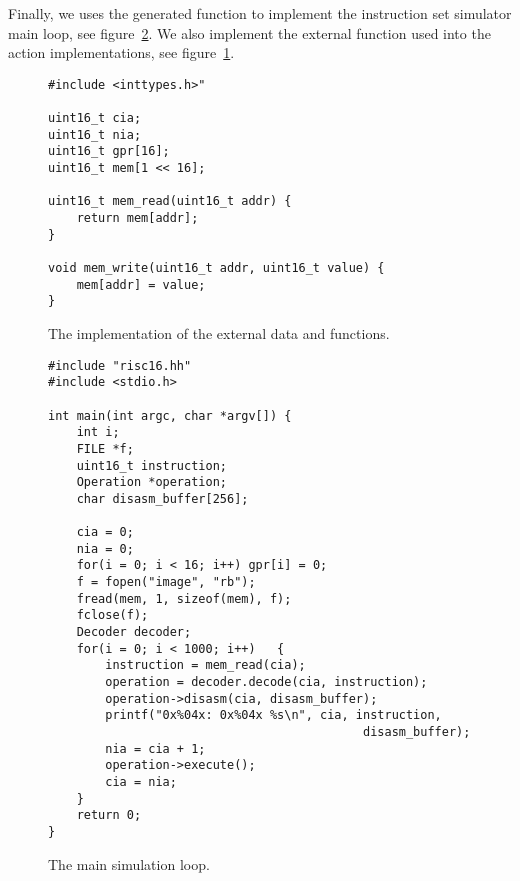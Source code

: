 Finally, we uses the generated function to implement the instruction set simulator main loop, see figure~\ref{main}.
We also implement the external function used into the action implementations, see figure~\ref{extern_impl}.

\begin{figure}[h!tb]
\begin{center}
\begin{verbatim}
#include <inttypes.h>"

uint16_t cia;
uint16_t nia;
uint16_t gpr[16];
uint16_t mem[1 << 16];

uint16_t mem_read(uint16_t addr) {
    return mem[addr];
}

void mem_write(uint16_t addr, uint16_t value) {
    mem[addr] = value;
}
\end{verbatim}
\caption{The implementation of the external data and functions.}
\label{extern_impl}
\end{center}
\end{figure}

\begin{figure}[h!tb]
\begin{center}
\begin{verbatim}
#include "risc16.hh"
#include <stdio.h>

int main(int argc, char *argv[]) {
    int i;
    FILE *f;
    uint16_t instruction;
    Operation *operation;
    char disasm_buffer[256];

    cia = 0;
    nia = 0;
    for(i = 0; i < 16; i++) gpr[i] = 0;
    f = fopen("image", "rb");
    fread(mem, 1, sizeof(mem), f);
    fclose(f);
    Decoder decoder;
    for(i = 0; i < 1000; i++)	{
        instruction = mem_read(cia);
        operation = decoder.decode(cia, instruction);
        operation->disasm(cia, disasm_buffer);
        printf("0x%04x: 0x%04x %s\n", cia, instruction,
                                            disasm_buffer);
        nia = cia + 1;
        operation->execute();
        cia = nia;
    }
    return 0;
}
\end{verbatim}
\caption{The main simulation loop.}
\label{main}
\end{center}
\end{figure}



